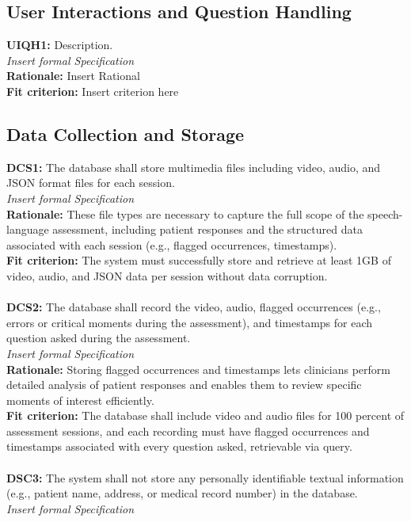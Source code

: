 \documentclass[12pt]{article}
\begin{document}
\subsection{User Interactions and Question Handling}
\textbf{UIQH1: } Description.\\
\textit{Insert formal Specification}\\
\textbf{Rationale: } Insert Rational\\
\textbf{Fit criterion: } Insert criterion here 

\subsection{Data Collection and Storage}
\textbf{DCS1: }The database shall store multimedia files including video, audio, and JSON format files for each session.\\
\textit{Insert formal Specification}\\
\textbf{Rationale: } These file types are necessary to capture the full scope of the speech-language assessment, 
including patient responses and the structured data associated with each session (e.g., flagged occurrences, 
timestamps).\\
\textbf{Fit criterion: } The system must successfully store and retrieve at least 1GB of video, audio, and JSON 
data per session without data corruption. \\\\
\textbf{DCS2: }The database shall record the video, audio, flagged occurrences (e.g., errors or critical moments
 during the assessment), and timestamps for each question asked during the assessment.\\
\textit{Insert formal Specification}\\
\textbf{Rationale: } Storing flagged occurrences and timestamps lets clinicians perform detailed analysis 
of patient responses and enables them to review specific moments of interest efficiently.\\
\textbf{Fit criterion: } The database shall include video and audio files for 100 percent of assessment sessions,
 and each recording must have flagged occurrences and timestamps associated with every question asked, 
 retrievable via query. \\\\
\textbf{DSC3: }The system shall not store any personally identifiable textual information (e.g., patient name, address, 
or medical record number) in the database.\\
\textit{Insert formal Specification}\\
\end{document}

